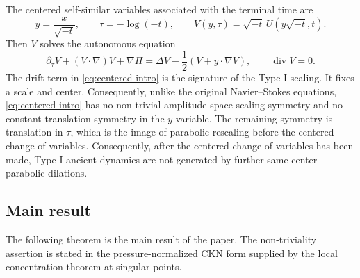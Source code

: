 \documentclass[11pt]{amsart}
\theoremstyle{plain}
\theoremstyle{definition}
\theoremstyle{remark}
\numberwithin{equation}{section}
\newcommand{\divergence}{\operatorname{div}}
\begin{document}
The centered self-similar variables associated with the terminal time are
\begin{equation}\label{eq:self-sim-vars-intro}
   y=\frac{x}{\sqrt{-t}},\qquad
   \tau=-\log(-t),\qquad
   V(y,\tau)=\sqrt{-t}\,U(y\sqrt{-t},t).
\end{equation}
Then \(V\) solves the autonomous equation
\begin{equation}\label{eq:centered-intro}
   \partial_\tau V+(V\cdot\nabla)V+\nabla\Pi
   =
   \Delta V-\frac12(V+y\cdot\nabla V),
   \qquad \divergence V=0.
\end{equation}
The drift term in \eqref{eq:centered-intro} is the signature of the Type I
scaling.  It fixes a scale and center.  Consequently, unlike the original
Navier--Stokes equations, \eqref{eq:centered-intro} has no non-trivial
amplitude-space scaling symmetry and no constant translation symmetry in the
\(y\)-variable.  The remaining symmetry is translation in \(\tau\), which is
the image of parabolic rescaling before the centered change of variables.
Consequently, after the centered change of variables has been made, Type I
ancient dynamics are not generated by further same-center parabolic dilations.

\subsection{Main result}

The following theorem is the main result of the paper.  The non-triviality
assertion is stated in the pressure-normalized CKN form supplied by the local
concentration theorem at singular points.
\end{document}
